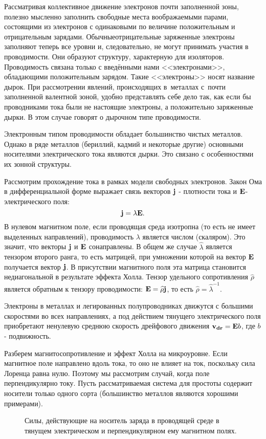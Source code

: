 \documentclass[a4paper,10pt,twoside]{article}
\begin{document}
Рассматривая коллективное движение электронов почти заполненной зоны, полезно мысленно заполнить свободные места
воображаемыми парами, состоящими из электронов с одинаковыми по величине положительным и отрицательным зарядами. Обычныеотрицательные заряженные электроны заполняют теперь все уровни и, следовательно, не могут принимать участия в проводимости. Они образуют структуру, характерную для изоляторов. Проводимость связана только с введёнными нами
<<электронами>>, обладающими положительным зарядом. Такие <<электроны>> носят название \textsf{дырок}. При рассмотрении явлений, происходящих в~металлах с~почти заполненной валентной зоной, удобно представлять себе дело так, как если бы проводниками тока были не настоящие электроны, а положительно заряженные дырки. В этом случае говорят о \textsf{дырочном типе проводимости}.

Электронным типом проводимости обладает большинство чистых металлов. Однако в ряде металлов (бериллий, кадмий и
некоторые другие) основными носителями электрического тока являются дырки. Это связано с особенностями их зонной
структуры.

Рассмотрим прохождение тока в рамках модели свободных электронов.
Закон Ома в дифференциальной форме выражает связь векторов ${\bf j}$ - плотности тока и ${\bf E}$- электрического поля:
\begin{equation}
{\bf j}=\lambda {\bf E}.
\end{equation}
 В нулевом магнитном поле, если проводящая среда изотропна (то есть не имеет выделенных направлений), проводимость $\lambda$ является числом (скаляром). Это значит, что векторы ${\bf j}$ и ${\bf E}$ сонаправлены. В общем же случае $\widehat{\lambda}$ является тензором второго ранга, то есть матрицей, при умножении которой на вектор ${\bf E}$ получается вектор ${\bf j}$. В присутствии магнитного поля эта матрица становится недиагональной в результате эффекта Холла. Тензор удельного сопротивления $\widehat{\rho}$ является обратным к тензору проводимости: ${\bf E}=\widehat{\rho} {\bf j}$, то есть $\widehat{\rho}=\widehat{\lambda}^{-1}$.

Электроны в металлах и легированных полупроводниках движутся с большими скоростями во всех направлениях, а под действием тянущего
электрического поля приобретают ненулевую среднюю скорость дрейфового движения ${\bf v_{dr}}= {\bf E}b$, где $b$ - подвижность.

Разберем магнитосопротивление и эффект Холла на микроуровне. Если магнитное поле направлено вдоль тока, то
оно не влияет на ток, поскольку сила Лоренца равна нулю. Поэтому мы рассмотрим случай, когда поле перпендикулярно
току. Пусть рассматриваемая система для простоты содержит носители только одного сорта (большинство металлов
являются хорошими примерами).
\begin{figure}
\vspace{0.1 in}
\centerline{}
\begin{minipage}{3.2in}
\caption{Силы, действующие на носитель заряда в проводящей среде в тянущем электрическом и перпендикулярном ему магнитном полях.}
\label{fig1}
\end{minipage}
\vspace{0.4 in}
\end{figure}
\end{document}
